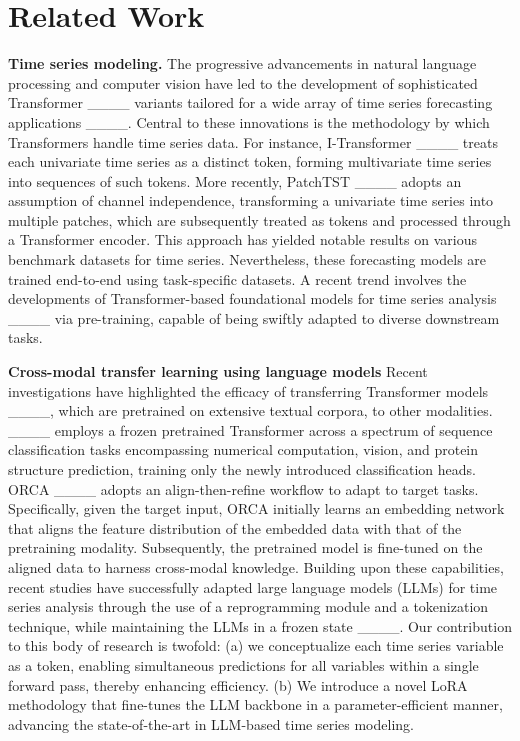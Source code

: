 \section{Related Work}
\noindent\textbf{Time series modeling.} \quad The progressive advancements in natural language processing and computer vision have led to the development of sophisticated Transformer ____ variants tailored for a wide array of time series forecasting applications ____. Central to these innovations is the methodology by which Transformers handle time series data. For instance, I-Transformer ____ treats each univariate time series as a distinct token, forming multivariate time series into sequences of such tokens. More recently, PatchTST ____ adopts an assumption of channel independence, transforming a univariate time series into multiple patches, which are subsequently treated as tokens and processed through a Transformer encoder. This approach has yielded notable results on various benchmark datasets for time series. Nevertheless, these forecasting models are trained end-to-end using task-specific datasets. A recent trend involves the developments of Transformer-based foundational models for time series analysis ____ via pre-training, capable of being swiftly adapted to diverse downstream tasks.



\noindent\textbf{Cross-modal transfer learning using language models} \quad Recent investigations have highlighted the efficacy of transferring Transformer models ____, which are pretrained on extensive textual corpora, to other modalities. ____ employs a frozen pretrained Transformer across a spectrum of sequence classification tasks encompassing numerical computation, vision, and protein structure prediction, training only the newly introduced classification heads. ORCA ____ adopts an align-then-refine workflow to adapt to target tasks. Specifically, given the target input, ORCA initially learns an embedding network that aligns the feature distribution of the embedded data with that of the pretraining modality. Subsequently, the pretrained model is fine-tuned on the aligned data to harness cross-modal knowledge. Building upon these capabilities, recent studies have successfully adapted large language models (LLMs) for time series analysis through the use of a reprogramming module and a tokenization technique, while maintaining the LLMs in a frozen state ____. Our contribution to this body of research is twofold: (a) we conceptualize each time series variable as a token, enabling simultaneous predictions for all variables within a single forward pass, thereby enhancing efficiency. (b) We introduce a novel LoRA methodology that fine-tunes the LLM backbone in a parameter-efficient manner, advancing the state-of-the-art in LLM-based time series modeling.




